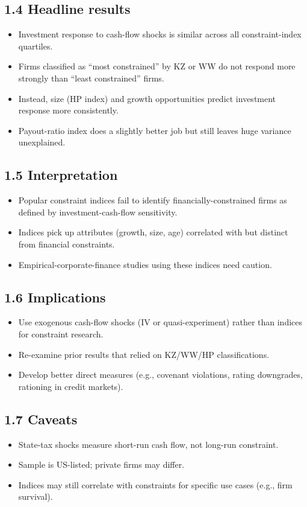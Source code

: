 \documentclass[11pt]{article}
\begin{document}
\subsection*{1.4 Headline results}
\begin{itemize}
\item Investment response to cash-flow shocks is similar across all constraint-index quartiles.
\item Firms classified as ``most constrained'' by KZ or WW do not respond more strongly than ``least constrained'' firms.
\item Instead, size (HP index) and growth opportunities predict investment response more consistently.
\item Payout-ratio index does a slightly better job but still leaves huge variance unexplained.
\end{itemize}

\subsection*{1.5 Interpretation}
\begin{itemize}
\item Popular constraint indices fail to identify financially-constrained firms as defined by investment-cash-flow sensitivity.
\item Indices pick up attributes (growth, size, age) correlated with but distinct from financial constraints.
\item Empirical-corporate-finance studies using these indices need caution.
\end{itemize}

\subsection*{1.6 Implications}
\begin{itemize}
\item Use exogenous cash-flow shocks (IV or quasi-experiment) rather than indices for constraint research.
\item Re-examine prior results that relied on KZ/WW/HP classifications.
\item Develop better direct measures (e.g., covenant violations, rating downgrades, rationing in credit markets).
\end{itemize}

\subsection*{1.7 Caveats}
\begin{alertbox}
\begin{itemize}
\item State-tax shocks measure short-run cash flow, not long-run constraint.
\item Sample is US-listed; private firms may differ.
\item Indices may still correlate with constraints for specific use cases (e.g., firm survival).
\end{itemize}
\end{alertbox}
\end{document}
